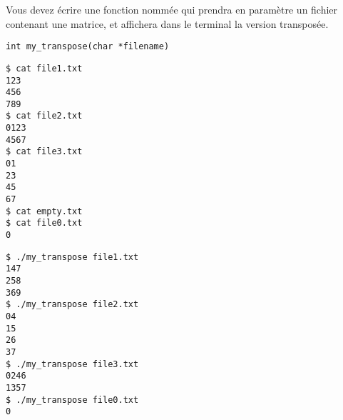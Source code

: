 

\vspace*{0.7cm}

\noindent {}

\bigskip


\noindent Vous devez écrire une fonction nommée  qui prendra en paramètre un fichier contenant une matrice, et affichera dans le terminal la version transposée.




\bigskip

\lstset{language=C}
\begin{lstlisting}[frame=single,title={Prototype de la fonction}]
int my_transpose(char *filename)
\end{lstlisting}


\vfillFirst

\lstset{language=sh}
\begin{lstlisting}[frame=single,title={Exemples de fichiers d'entrée}]
$ cat file1.txt
123
456
789
$ cat file2.txt
0123
4567
$ cat file3.txt
01
23
45
67
$ cat empty.txt
$ cat file0.txt
0
\end{lstlisting}



\vfillLast

\clearpage

\vfillFirst


\lstset{language=sh}
\begin{lstlisting}[frame=single,title={Cas général}]
$ ./my_transpose file1.txt
147
258
369
$ ./my_transpose file2.txt
04
15
26
37
$ ./my_transpose file3.txt
0246
1357
$ ./my_transpose file0.txt
0
\end{lstlisting}

